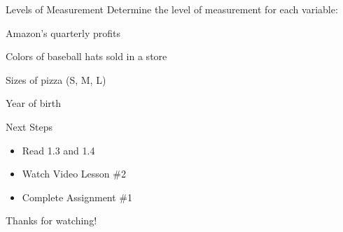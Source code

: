 \documentclass[t]{beamer}
\newcommand{\?}{\stackrel{?}{=}}
\begin{document}
	\begin{frame}{Levels of Measurement}
		Determine the level of measurement for each variable:
		
		Amazon's quarterly profits
		
		
		Colors of baseball hats sold in a store
		
		
		Sizes of pizza (S, M, L)
		
		
		Year of birth
		
	\end{frame}

	\begin{frame}{Next Steps}
		\begin{itemize}
			\item Read 1.3 and 1.4
			\item Watch Video Lesson \#2
			\item Complete Assignment \#1
		\end{itemize}
	
		\vfill
		
		Thanks for watching!
	\end{frame}
	
\end{document}
